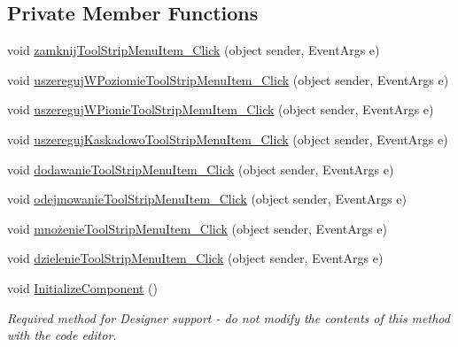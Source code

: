\subsection*{Private Member Functions}
\begin{DoxyCompactItemize}
\item 
void \mbox{\hyperlink{class_quiz___matematyczny_1_1_cwiczenia_a7a298c65928455d299e07bd3ad27dc37}{zamknij\+Tool\+Strip\+Menu\+Item\+\_\+\+Click}} (object sender, Event\+Args e)
\item 
void \mbox{\hyperlink{class_quiz___matematyczny_1_1_cwiczenia_a1b5806013f517d8540b3c701b0744f9e}{uszereguj\+W\+Poziomie\+Tool\+Strip\+Menu\+Item\+\_\+\+Click}} (object sender, Event\+Args e)
\item 
void \mbox{\hyperlink{class_quiz___matematyczny_1_1_cwiczenia_a5b4577b64be6c1e80e976d70dc59996d}{uszereguj\+W\+Pionie\+Tool\+Strip\+Menu\+Item\+\_\+\+Click}} (object sender, Event\+Args e)
\item 
void \mbox{\hyperlink{class_quiz___matematyczny_1_1_cwiczenia_a93f114f26d8a2872e3932317c611347e}{uszereguj\+Kaskadowo\+Tool\+Strip\+Menu\+Item\+\_\+\+Click}} (object sender, Event\+Args e)
\item 
void \mbox{\hyperlink{class_quiz___matematyczny_1_1_cwiczenia_adb1ca88621f54493b5101676d51a10bd}{dodawanie\+Tool\+Strip\+Menu\+Item\+\_\+\+Click}} (object sender, Event\+Args e)
\item 
void \mbox{\hyperlink{class_quiz___matematyczny_1_1_cwiczenia_a6acf17414ee85e558fc8d50d9dbc7225}{odejmowanie\+Tool\+Strip\+Menu\+Item\+\_\+\+Click}} (object sender, Event\+Args e)
\item 
void \mbox{\hyperlink{class_quiz___matematyczny_1_1_cwiczenia_a45aa4c5b212e141fe709688b79254ef2}{mnożenie\+Tool\+Strip\+Menu\+Item\+\_\+\+Click}} (object sender, Event\+Args e)
\item 
void \mbox{\hyperlink{class_quiz___matematyczny_1_1_cwiczenia_a67304a79ffbff4b960a2a0ac80a485c8}{dzielenie\+Tool\+Strip\+Menu\+Item\+\_\+\+Click}} (object sender, Event\+Args e)
\item 
void \mbox{\hyperlink{class_quiz___matematyczny_1_1_cwiczenia_a2e9cb91dccbe8001cafa7052c3811556}{Initialize\+Component}} ()
\begin{DoxyCompactList}\small\item\em Required method for Designer support -\/ do not modify the contents of this method with the code editor. \end{DoxyCompactList}\end{DoxyCompactItemize}
